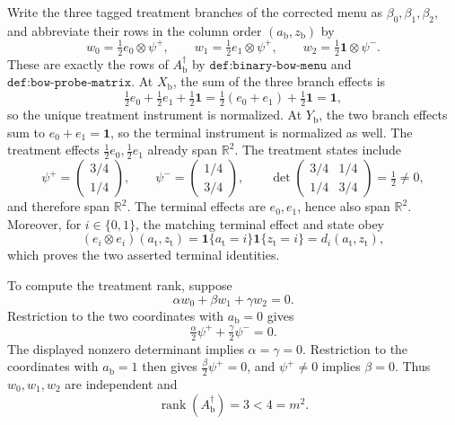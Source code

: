 Write the three tagged treatment branches of the corrected menu as \(\beta_0,\beta_1,\beta_2\), and abbreviate their rows in the column order \((a_{\mathrm b},z_{\mathrm b})\) by
\[
w_0=\tfrac12 e_0\otimes\psi^+,
\qquad
w_1=\tfrac12 e_1\otimes\psi^+,
\qquad
w_2=\tfrac12\mathbf 1\otimes\psi^-.
\]
These are exactly the rows of \(A_{\mathrm b}^{\dagger}\) by \(\texttt{def:binary-bow-menu}\) and \(\texttt{def:bow-probe-matrix}\).  At \(X_{\mathrm b}\), the sum of the three branch effects is
\[
\tfrac12e_0+\tfrac12e_1+\tfrac12\mathbf 1
=\tfrac12(e_0+e_1)+\tfrac12\mathbf 1
=\mathbf 1,
\]
so the unique treatment instrument is normalized.  At \(Y_{\mathrm b}\), the two branch effects sum to \(e_0+e_1=\mathbf 1\), so the terminal instrument is normalized as well.  The treatment effects \(\tfrac12e_0,\tfrac12e_1\) already span \(\mathbb R^2\).  The treatment states include
\[
\psi^+=\begin{pmatrix}3/4\\1/4\end{pmatrix},
\qquad
\psi^-=\begin{pmatrix}1/4\\3/4\end{pmatrix},
\qquad
\det\begin{pmatrix}3/4&1/4\\1/4&3/4\end{pmatrix}=\tfrac12\ne0,
\]
and therefore span \(\mathbb R^2\).  The terminal effects are \(e_0,e_1\), hence also span \(\mathbb R^2\).  Moreover, for \(i\in\{0,1\}\), the matching terminal effect and state obey
\[
(e_i\otimes e_i)(a_{\mathrm t},z_{\mathrm t})
=\mathbf 1\{a_{\mathrm t}=i\}\mathbf 1\{z_{\mathrm t}=i\}
=d_i(a_{\mathrm t},z_{\mathrm t}),
\]
which proves the two asserted terminal identities.

To compute the treatment rank, suppose
\[
\alpha w_0+\beta w_1+\gamma w_2=0.
\]
Restriction to the two coordinates with \(a_{\mathrm b}=0\) gives
\[
\tfrac\alpha2\psi^++\tfrac\gamma2\psi^-=0.
\]
The displayed nonzero determinant implies \(\alpha=\gamma=0\).  Restriction to the coordinates with \(a_{\mathrm b}=1\) then gives \(\tfrac\beta2\psi^+=0\), and \(\psi^+\ne0\) implies \(\beta=0\).  Thus \(w_0,w_1,w_2\) are independent and
\[
\operatorname{rank}(A_{\mathrm b}^{\dagger})=3<4=m^2.
\]

